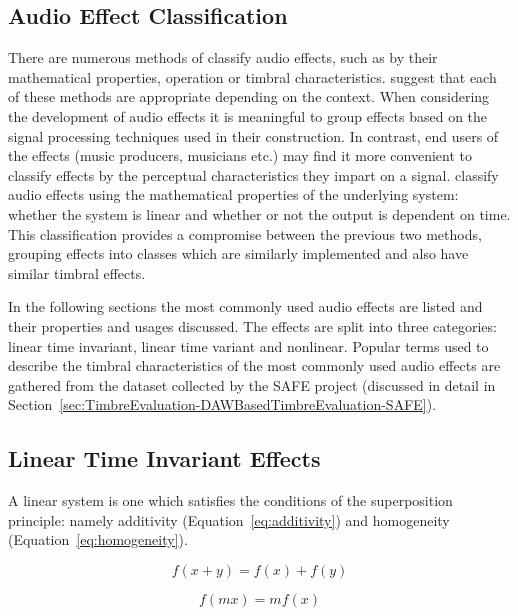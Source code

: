 	\subsection{Audio Effect Classification}
	\label{sec:Timbre-AudioProcessing-Classification}
		There are numerous methods of classify audio effects, such as by their mathematical properties, operation
		or timbral characteristics. \citet{verfaille2006an} suggest that each of these methods are appropriate
		depending on the context. When considering the development of audio effects it is meaningful to group
		effects based on the signal processing techniques used in their construction. In contrast, end users of the
		effects (music producers, musicians etc.) may find it more convenient to classify effects by the perceptual
		characteristics they impart on a signal. \citet{eichas2015feature} classify audio effects using the
		mathematical properties of the underlying system: whether the system is linear and whether or not the
		output is dependent on time. This classification provides a compromise between the previous two methods,
		grouping effects into classes which are similarly implemented and also have similar timbral effects.
		
		In the following sections the most commonly used audio effects are listed and their properties and usages
		discussed. The effects are split into three categories: linear time invariant, linear time variant and
		nonlinear. Popular terms used to describe the timbral characteristics of the most commonly used audio
		effects are gathered from the dataset collected by the SAFE project (discussed in detail in
		Section~\ref{sec:TimbreEvaluation-DAWBasedTimbreEvaluation-SAFE}).

	\subsection{Linear Time Invariant Effects}
	\label{sec:Timbre-AudioProcessing-LTI}
		A linear system is one which satisfies the conditions of the superposition principle: namely additivity
		(Equation~\ref{eq:additivity}) and homogeneity (Equation~\ref{eq:homogeneity}).

		\begin{equation} f(x + y) = f(x) + f(y) \label{eq:additivity} \end{equation}

		\begin{equation} f(mx) = mf(x) \label{eq:homogeneity} \end{equation}

